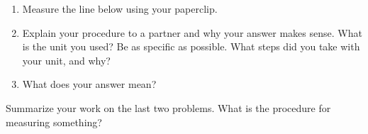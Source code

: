 \documentclass[nooutcomes,noauthor, handout]{ximera}
\begin{document}
\begin{problem}
\begin{enumerate}
\item Measure the line below using your paperclip. 
\item Explain your procedure to a partner and why your answer makes sense. What is the unit you used? Be as specific as possible. What steps did you take with your unit, and why?
\item What does your answer mean?
\end{enumerate}
\begin{center}
\end{center}
%
\end{problem}
\vfill 
\begin{problem}
Summarize your work on the last two problems. What is the procedure for measuring something?
\end{problem}
\end{document}

